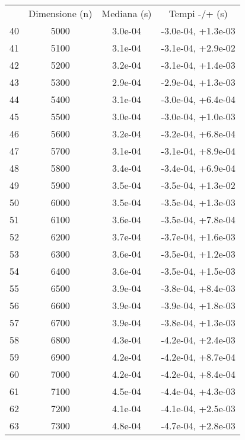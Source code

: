 \begin{table}
\centering
\begin{adjustbox}{width=1\textwidth/2}
\begin{tabular}{|c|c|c|c|}
\hline
 & Dimensione (n) & Mediana (s) & Tempi -/+ (s) \\
40 & 5000 & 3.0e-04 & -3.0e-04, +1.3e-03 \\
\cline{1-4}
41 & 5100 & 3.1e-04 & -3.1e-04, +2.9e-02 \\
\cline{1-4}
42 & 5200 & 3.2e-04 & -3.1e-04, +1.4e-03 \\
\cline{1-4}
43 & 5300 & 2.9e-04 & -2.9e-04, +1.3e-03 \\
\cline{1-4}
44 & 5400 & 3.1e-04 & -3.0e-04, +6.4e-04 \\
\cline{1-4}
45 & 5500 & 3.0e-04 & -3.0e-04, +1.0e-03 \\
\cline{1-4}
46 & 5600 & 3.2e-04 & -3.2e-04, +6.8e-04 \\
\cline{1-4}
47 & 5700 & 3.1e-04 & -3.1e-04, +8.9e-04 \\
\cline{1-4}
48 & 5800 & 3.4e-04 & -3.4e-04, +6.9e-04 \\
\cline{1-4}
49 & 5900 & 3.5e-04 & -3.5e-04, +1.3e-02 \\
\cline{1-4}
50 & 6000 & 3.5e-04 & -3.5e-04, +1.3e-03 \\
\cline{1-4}
51 & 6100 & 3.6e-04 & -3.5e-04, +7.8e-04 \\
\cline{1-4}
52 & 6200 & 3.7e-04 & -3.7e-04, +1.6e-03 \\
\cline{1-4}
53 & 6300 & 3.6e-04 & -3.5e-04, +1.2e-03 \\
\cline{1-4}
54 & 6400 & 3.6e-04 & -3.5e-04, +1.5e-03 \\
\cline{1-4}
55 & 6500 & 3.9e-04 & -3.8e-04, +8.4e-03 \\
\cline{1-4}
56 & 6600 & 3.9e-04 & -3.9e-04, +1.8e-03 \\
\cline{1-4}
57 & 6700 & 3.9e-04 & -3.8e-04, +1.3e-03 \\
\cline{1-4}
58 & 6800 & 4.3e-04 & -4.2e-04, +2.4e-03 \\
\cline{1-4}
59 & 6900 & 4.2e-04 & -4.2e-04, +8.7e-04 \\
\cline{1-4}
60 & 7000 & 4.2e-04 & -4.2e-04, +8.4e-04 \\
\cline{1-4}
61 & 7100 & 4.5e-04 & -4.4e-04, +4.3e-03 \\
\cline{1-4}
62 & 7200 & 4.1e-04 & -4.1e-04, +2.5e-03 \\
\cline{1-4}
63 & 7300 & 4.8e-04 & -4.7e-04, +2.8e-03 \\

\end{tabular}
\end{adjustbox}
\end{table}
